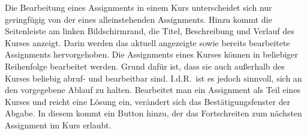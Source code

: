 Die Bearbeitung eines Assignments in einem Kurs unterscheidet sich nur geringfügig von der eines alleinstehenden Assignments.
Hinzu kommt die Seitenleiste am linken Bildschirmrand, die Titel, Beschreibung und Verlauf des Kurses anzeigt.
Darin werden das aktuell angezeigte sowie bereits bearbeitete Assignments hervorgehoben.
Die Assignments eines Kurses können in beliebiger Reihenfolge bearbeitet werden.
Grund dafür ist, dass sie auch außerhalb des Kurses beliebig abruf- und bearbeitbar sind.
I.d.R.\ ist es jedoch sinnvoll, sich an den vorgegebene Ablauf zu halten.
Bearbeitet man ein Assignment als Teil eines Kurses und reicht eine Lösung ein, verändert sich das Bestätigungsfenster der Abgabe.
In diesem kommt ein Button hinzu, der das Fortschreiten zum nächsten Assignment im Kurs erlaubt.


